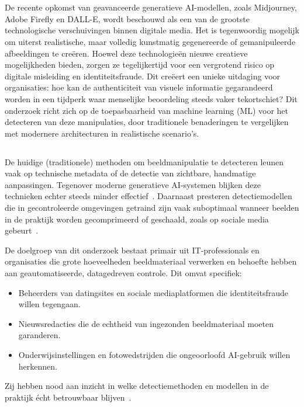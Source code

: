 
\chapter{}%
\label{ch:inleiding}

De recente opkomst van geavanceerde generatieve AI-modellen, zoals Midjourney, Adobe Firefly en DALL-E, wordt beschouwd als een van de grootste technologische verschuivingen binnen digitale media. Het is tegenwoordig mogelijk om uiterst realistische, maar volledig kunstmatig gegenereerde of gemanipuleerde afbeeldingen te creëren. Hoewel deze technologieën nieuwe creatieve mogelijkheden bieden, zorgen ze tegelijkertijd voor een vergrotend risico op digitale misleiding en identiteitsfraude. Dit creëert een unieke uitdaging voor organisaties: hoe kan de authenticiteit van visuele informatie gegarandeerd worden in een tijdperk waar menselijke beoordeling steeds vaker tekortschiet? Dit onderzoek richt zich op de toepasbaarheid van machine learning (ML) voor het detecteren van deze manipulaties, door traditionele benaderingen te vergelijken met modernere architecturen in realistische scenario's.

\section{}%
\label{sec:probleemstelling}

De huidige (traditionele) methoden om beeldmanipulatie te detecteren leunen vaak op technische metadata of de detectie van zichtbare, handmatige aanpassingen. Tegenover moderne generatieve AI-systemen blijken deze technieken echter steeds minder effectief~\autocite{Pei2024}. Daarnaast presteren detectiemodellen die in gecontroleerde omgevingen getraind zijn vaak suboptimaal wanneer beelden in de praktijk worden gecomprimeerd of geschaald, zoals op sociale media gebeurt~\autocite{EvaluationModels2025}.

De doelgroep van dit onderzoek bestaat primair uit IT-professionals en organisaties die grote hoeveelheden beeldmateriaal verwerken en behoefte hebben aan geautomatiseerde, datagedreven controle. Dit omvat specifiek:
\begin{itemize}
    \item Beheerders van datingsites en sociale mediaplatformen die identiteitsfraude willen tegengaan.
    \item Nieuwsredacties die de echtheid van ingezonden beeldmateriaal moeten garanderen.
    \item Onderwijsinstellingen en fotowedstrijden die ongeoorloofd AI-gebruik willen herkennen.
\end{itemize}
Zij hebben nood aan inzicht in welke detectiemethoden en modellen in de praktijk écht betrouwbaar blijven~\autocite{MultimodalSurvey2025,Raza2026}.

